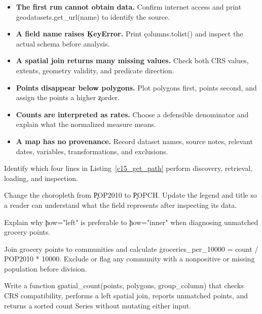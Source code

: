 
\begin{itemize}
    \item \textbf{The first run cannot obtain data.} Confirm internet access and
          print \c{geodatasets.get_url(name)} to identify the source.
    \item \textbf{A field name raises \c{KeyError}.} Print \c{columns.tolist()}
          and inspect the actual schema before analysis.
    \item \textbf{A spatial join returns many missing values.} Check both CRS
          values, extents, geometry validity, and predicate direction.
    \item \textbf{Points disappear below polygons.} Plot polygons first, points
          second, and assign the points a higher \c{zorder}.
    \item \textbf{Counts are interpreted as rates.} Choose a defensible
          denominator and explain what the normalized measure means.
    \item \textbf{A map has no provenance.} Record dataset names, source notes,
          relevant dates, variables, transformations, and exclusions.
\end{itemize}



Identify which four lines in Listing~\ref{c15_get_path} perform discovery,
retrieval, loading, and inspection.


Change the choropleth from \c{POP2010} to \c{POPCH}. Update the legend and title
so a reader can understand what the field represents after inspecting its data.


Explain why \c{how="left"} is preferable to \c{how="inner"} when diagnosing
unmatched grocery points.


Join grocery points to communities and calculate
\c{groceries_per_10000 = count / POP2010 * 10000}. Exclude or flag any community
with a nonpositive or missing population before division.


Write a function \c{spatial_count(points, polygons, group_column)} that checks
CRS compatibility, performs a left spatial join, reports unmatched points, and
returns a sorted count Series without mutating either input.

